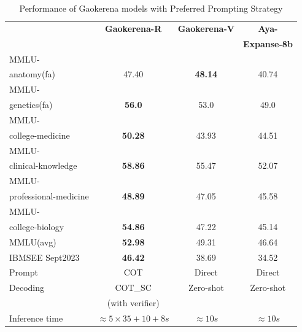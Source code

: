 \documentclass[review]{elsarticle}
\begin{document}
\begin{table}[ht]
		\centering
		\begin{tabular}{|l|c|c|c|}
			\hline
			 & \textbf{Gaokerena-R} & \textbf{Gaokerena-V} & \textbf{Aya-}\\
             &  & & \textbf{Expanse-8b}\\ \hline
            MMLU-  &   &   &\\
			anatomy(fa)  & 47.40  & \textbf{48.14}   & 40.74\\ \hline
            MMLU-  &   &   &\\
			genetics(fa)& \textbf{56.0}  & 53.0  & 49.0 \\ \hline
            MMLU-  &   &   &\\
			college-medicine & \textbf{50.28} & 43.93   & 44.51   \\ \hline
            MMLU-  &   &   &\\
			clinical-knowledge & \textbf{58.86}  & 55.47  & 52.07\\ \hline
            MMLU-  &   &   &\\
			professional-medicine& \textbf{48.89} & 47.05  & 45.58\\  \hline
            MMLU-  &   &   &\\
			college-biology& \textbf{54.86} & 47.22   & 45.14 \\ \hline
			MMLU(avg) & \textbf{52.98}  & 49.31   & 46.64 \\ \hline
			IBMSEE Sept2023 & \textbf{46.42}  &38.69   & 34.52 \\ \hline
            Prompt & COT & Direct  & Direct \\ \hline
            Decoding & COT\_SC & Zero-shot  & Zero-shot \\
             & (with verifier) &   &  \\ \hline
			Inference time & $\approx 5 \times 35 + 10 + 8 s$ & $\approx 10s$  & $\approx 10s$\\  \hline
		\end{tabular}
        \caption{Performance of Gaokerena models with Preferred Prompting Strategy}
		\label{tab:med_opns_comparison}
\end{table}
\end{document}
